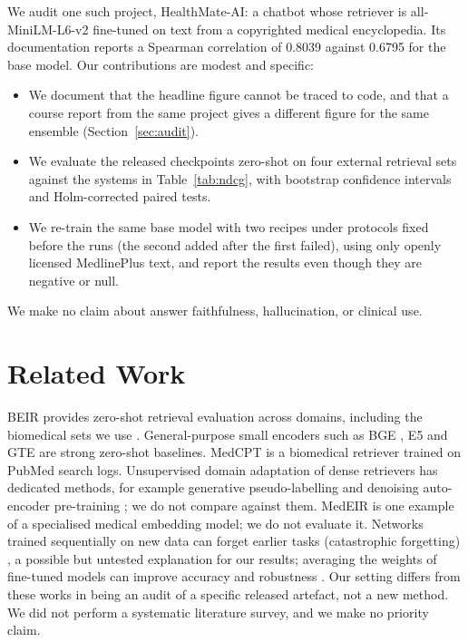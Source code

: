\documentclass[11pt]{article}
\begin{document}
We audit one such project, HealthMate-AI: a chatbot whose retriever is all-MiniLM-L6-v2 \citep{reimers2019sbert,wang2020minilm} fine-tuned on text from a copyrighted medical encyclopedia. Its documentation reports a Spearman correlation of 0.8039 against 0.6795 for the base model. Our contributions are modest and specific:
\begin{itemize}
\item We document that the headline figure cannot be traced to code, and that a course report from the same project gives a different figure for the same ensemble (Section~\ref{sec:audit}).
\item We evaluate the released checkpoints zero-shot on four external retrieval sets against the systems in Table~\ref{tab:ndcg}, with bootstrap confidence intervals and Holm-corrected paired tests.
\item We re-train the same base model with two recipes under protocols fixed before the runs (the second added after the first failed), using only openly licensed MedlinePlus text, and report the results even though they are negative or null.
\end{itemize}
We make no claim about answer faithfulness, hallucination, or clinical use.

\section{Related Work}
BEIR \citep{thakur2021beir} provides zero-shot retrieval evaluation across domains, including the biomedical sets we use \citep{wadden2020scifact,boteva2016nfcorpus,voorhees2020trec}. General-purpose small encoders such as BGE \citep{xiao2023cpack}, E5 \citep{wang2022e5} and GTE \citep{li2023gte} are strong zero-shot baselines. MedCPT \citep{jin2023medcpt} is a biomedical retriever trained on PubMed search logs. Unsupervised domain adaptation of dense retrievers has dedicated methods, for example generative pseudo-labelling \citep{wang2022gpl} and denoising auto-encoder pre-training \citep{wang2021tsdae}; we do not compare against them. MedEIR \citep{selvadurai2025medeir} is one example of a specialised medical embedding model; we do not evaluate it. Networks trained sequentially on new data can forget earlier tasks (catastrophic forgetting) \citep{kirkpatrick2017ewc}, a possible but untested explanation for our results; averaging the weights of fine-tuned models can improve accuracy and robustness \citep{wortsman2022soups}. Our setting differs from these works in being an audit of a specific released artefact, not a new method. We did not perform a systematic literature survey, and we make no priority claim.
\end{document}
